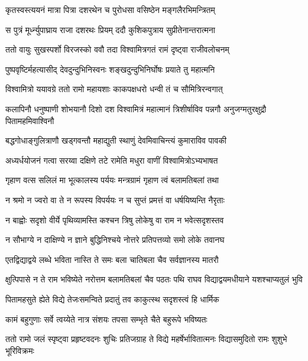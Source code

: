 \twolineshloka
{कृतस्वस्त्ययनं मात्रा पित्रा दशरथेन च}
{पुरोधसा वसिष्ठेन मङ्गलैरभिमन्त्रितम्} %

\twolineshloka
{स पुत्रं मूर्ध्न्युपाघ्राय राजा दशरथः प्रियम्}
{ददौ कुशिकपुत्राय सुप्रीतेनान्तरात्मना} %

\twolineshloka
{ततो वायुः सुखस्पर्शो विरजस्को ववौ तदा}
{विश्वामित्रगतं रामं दृष्ट्वा राजीवलोचनम्} %

\twolineshloka
{पुष्पवृष्टिर्महत्यासीद् देवदुन्दुभिनिस्वनः}
{शङ्खदुन्दुभिनिर्घोषः प्रयाते तु महात्मनि} %

\twolineshloka
{विश्वामित्रो ययावग्रे ततो रामो महायशाः}
{काकपक्षधरो धन्वी तं च सौमित्रिरन्वगात्} %

\threelineshloka
{कलापिनौ धनुष्पाणी शोभयानौ दिशो दश}
{विश्वामित्रं महात्मानं त्रिशीर्षाविव पन्नगौ}
{अनुजग्मतुरक्षुद्रौ पितामहमिवाश्विनौ} %

\twolineshloka
{बद्धगोधाङ्गुलित्राणौ खड्गवन्तौ महाद्युती}
{स्थाणुं देवमिवाचिन्त्यं कुमाराविव पावकी} %

\twolineshloka
{अध्यर्धयोजनं गत्वा सरय्वा दक्षिणे तटे}
{रामेति मधुरा वाणीं विश्वामित्रोऽभ्यभाषत} %

\twolineshloka
{गृहाण वत्स सलिलं मा भूत्कालस्य पर्ययः}
{मन्त्रग्रामं गृहाण त्वं बलामतिबलां तथा} %

\twolineshloka
{न श्रमो न ज्वरो वा ते न रूपस्य विपर्ययः}
{न च सुप्तं प्रमत्तं वा धर्षयिष्यन्ति नैरृताः} %

\twolineshloka
{न बाह्वोः सदृशो वीर्ये पृथिव्यामस्ति कश्चन}
{त्रिषु लोकेषु वा राम न भवेत्सदृशस्तव} %

\twolineshloka
{न सौभाग्ये न दाक्षिण्ये न ज्ञाने बुद्धिनिश्चये}
{नोत्तरे प्रतिपत्तव्यो समो लोके तवानघ} %

\twolineshloka
{एतद्विद्याद्वये लब्धे भविता नास्ति ते समः}
{बला चातिबला चैव सर्वज्ञानस्य मातरौ} %

\threelineshloka
{क्षुत्पिपासे न ते राम भविष्येते नरोत्तम}
{बलामतिबलां चैव पठतः पथि राघव}
{विद्याद्वयमधीयाने यशश्चाप्यतुलं भुवि} %

\twolineshloka
{पितामहसुते ह्येते विद्ये तेजःसमन्विते}
{प्रदातुं तव काकुत्स्थ सदृशस्त्वं हि धार्मिक} %

\twolineshloka
{कामं बहुगुणाः सर्वे त्वय्येते नात्र संशयः}
{तपसा सम्भृते चैते बहुरूपे भविष्यतः} %

\threelineshloka
{ततो रामो जलं स्पृष्ट्वा प्रहृष्टवदनः शुचिः}
{प्रतिजग्राह ते विद्ये महर्षेर्भावितात्मनः}
{विद्यासमुदितो रामः शुशुभे भूरिविक्रमः} %

